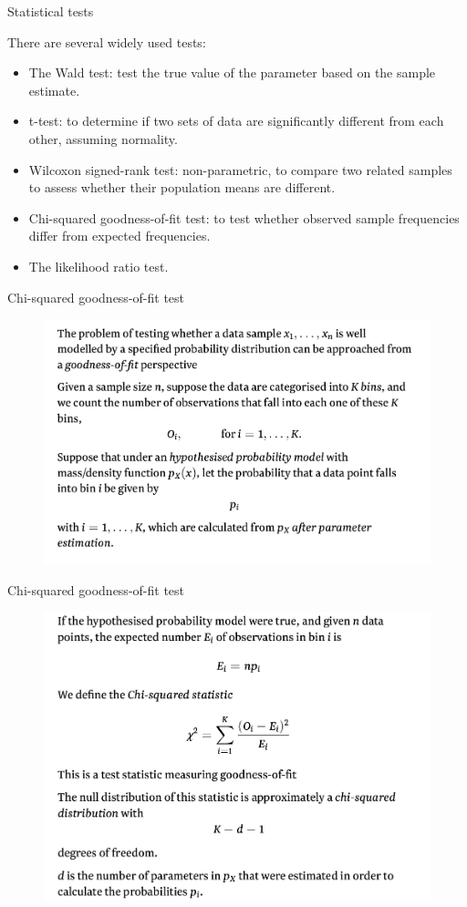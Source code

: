 \documentclass{beamer}
\begin{document}
\begin{frame}{Statistical tests}

	There are several widely used tests:
	\begin{itemize}
		\item The Wald test: test the true value of the parameter based on the sample estimate.
		\item t-test: to determine if two sets of data are significantly different from each other, assuming normality.
		\item Wilcoxon signed-rank test: non-parametric, to compare two related samples to assess whether their population means are different.
		\item Chi-squared goodness-of-fit test: to test whether observed sample frequencies differ from expected frequencies.
		\item The likelihood ratio test.

	\end{itemize}

\end{frame}

\begin{frame}{Chi-squared goodness-of-fit test}
	\begin{figure}
                \includegraphics[width=0.85\linewidth]{gof1.png}
        \end{figure}	
\end{frame}

\begin{frame}{Chi-squared goodness-of-fit test}
        \begin{figure}
                \includegraphics[width=0.85\linewidth]{gof2.png}
        \end{figure}
\end{frame}
\end{document}

